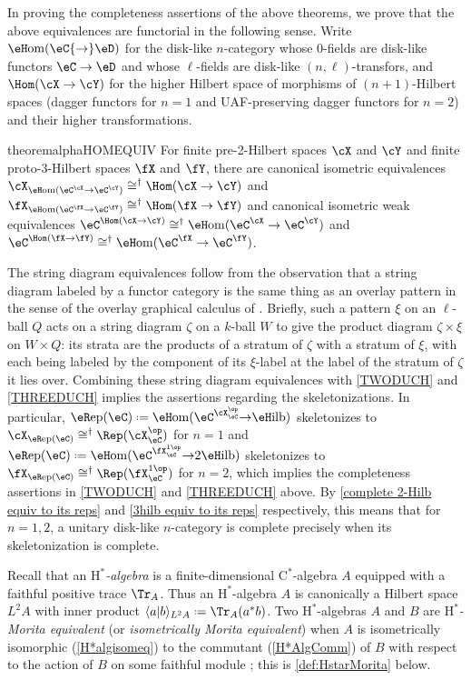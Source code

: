 \documentclass[12pt,reqno]{amsart}
\newcounter{alpha}\renewcommand\thealpha{\upshape\Alph{alpha}}
\newcommand{\eRep}{{\eR}\mathrm{ep}}
\newcommand{\eFun}{{\eH}\mathrm{om}}
\newcommand{\eHilb}{{\eH}\mathrm{ilb}}
\newcommand{\C}{\eC}
\newcommand{\D}{\eD}
\newcommand{\bkt}[2]{\langle #1|#2 \rangle}
\newcommand{\Cstar}{\ensuremath{\mathrm{C}^{*}}}
\newcommand{\Hstar}{\ensuremath{\mathrm{H}^{*}}}
\newcommand{\defn}[1]{\emph{#1}}
\DeclareRobustCommand{\coloneq}{\mathrel{\vcenter{\baselineskip0.5ex\lineskiplimit0pt\hbox{\scriptsize{\upshape.}}\hbox{\scriptsize{\upshape.}}}}=}
\begin{document}
In proving the completeness assertions of the above theorems, we prove that the above equivalences are functorial in the following sense. Write $\eFun(\C{\to}\D)$ for the disk-like $n$-category whose $0$-fields are disk-like functors $\C\to\D$ and whose $\ell$-fields are disk-like $(n,\ell)$-transfors, and $\Hom(\cX\to\cY)$ for the higher Hilbert space of morphisms of $(n+1)$-Hilbert spaces (dagger functors for $n=1$ and UAF-preserving dagger functors for $n=2$) and their higher transformations.

\begin{restatable}{theoremalpha}{HOMEQUIV}
    \label{HOMEQUIV}
For finite pre-2-Hilbert spaces $\cX$ and $\cY$ and finite proto-3-Hilbert spaces $\fX$ and $\fY$, there are canonical isometric equivalences $\cX_{\eFun(\eC^\cX\to\eC^\cY)}\cong^\dag\Hom(\cX\to\cY)$ and
$\fX_{\eFun(\C^\fX\to\C^\fY)}\cong^\dag\Hom(\fX\to\fY)$ and canonical isometric weak equivalences
$\eC^{\Hom(\cX\to\cY)}\cong^\dag\eFun(\eC^\cX\to\eC^\cY)$ and
$\C^{\Hom(\fX\to\fY)}\cong^\dag\eFun(\C^\fX\to\C^\fY)$.
\end{restatable}

The string diagram equivalences follow from the observation that a string diagram labeled by a functor category is the same thing as an overlay pattern in the sense of the overlay graphical calculus of \cite[\S2.4]{CP22}. Briefly, such a pattern $\xi$ on an $\ell$-ball $Q$ acts on a string diagram $\zeta$ on a $k$-ball $W$ to give the product diagram $\zeta\times\xi$ on $W\times Q$: its strata are the products of a stratum of $\zeta$ with a stratum of $\xi$, with each being labeled by the component of its $\xi$-label at the label of the stratum of $\zeta$ it lies over. Combining these string diagram equivalences with \cref{TWODUCH} and \cref{THREEDUCH} implies the assertions regarding the skeletonizations. In particular, $\eRep(\eC)\coloneq\eFun(\eC^{\cX_\eC^\op}{\to}\eHilb)$ skeletonizes to $\cX_{\eRep(\eC)}\cong^\dag\Rep(\cX_\eC^\op)$ for $n=1$ and $\eRep(\C)\coloneq\eFun(\C^{\fX_\C^{1\op}}{\to}2\eHilb)$ skeletonizes to $\fX_{\eRep(\C)}\cong^\dag\Rep(\fX_\C^{1\op})$ for $n=2$, which implies the completeness assertions in \cref{TWODUCH} and \cref{THREEDUCH} above. By \cref{complete 2-Hilb equiv to its reps} and \cref{3hilb equiv to its reps} respectively, this means that for $n=1,2$, a unitary disk-like $n$-category is complete precisely when its skeletonization is complete. 

Recall that an \defn{$\Hstar$-algebra} is a finite-dimensional $\Cstar$-algebra $A$ equipped with a faithful positive trace $\Tr_A$. Thus an $\Hstar$-algebra $A$ is canonically a Hilbert space $L^2A$ with inner product $\bkt{a}{b}_{L^2A}\coloneq\Tr_A(a^* b)$. Two $\Hstar$-algebras $A$ and $B$ are \defn{$\Hstar$-Morita equivalent} (or \defn{isometrically Morita equivalent}) when $A$ is isometrically isomorphic (\cref{H*algisomeq}) to the commutant (\cref{H*AlgComm}) of $B$ with respect to the action of $B$ on some faithful module \cite[Exm. 3.7.9]{UQSL}; this is \cref{def:HstarMorita} below.
\end{document}
